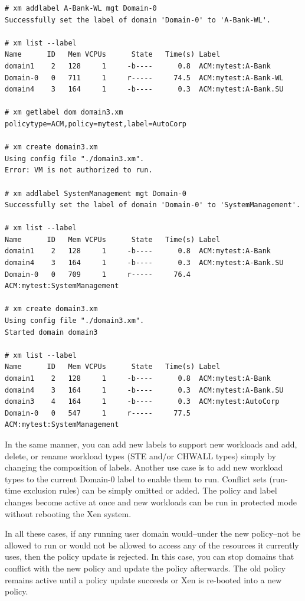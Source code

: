 \documentclass[11pt,twoside,final,openright]{report}
\begin{document}
\begin{scriptsize}
\begin{verbatim}
# xm addlabel A-Bank-WL mgt Domain-0
Successfully set the label of domain 'Domain-0' to 'A-Bank-WL'.

# xm list --label
Name      ID   Mem VCPUs      State   Time(s) Label
domain1    2   128     1     -b----      0.8  ACM:mytest:A-Bank
Domain-0   0   711     1     r-----     74.5  ACM:mytest:A-Bank-WL
domain4    3   164     1     -b----      0.3  ACM:mytest:A-Bank.SU

# xm getlabel dom domain3.xm
policytype=ACM,policy=mytest,label=AutoCorp

# xm create domain3.xm
Using config file "./domain3.xm".
Error: VM is not authorized to run.

# xm addlabel SystemManagement mgt Domain-0
Successfully set the label of domain 'Domain-0' to 'SystemManagement'.

# xm list --label
Name      ID   Mem VCPUs      State   Time(s) Label
domain1    2   128     1     -b----      0.8  ACM:mytest:A-Bank
domain4    3   164     1     -b----      0.3  ACM:mytest:A-Bank.SU
Domain-0   0   709     1     r-----     76.4  ACM:mytest:SystemManagement

# xm create domain3.xm
Using config file "./domain3.xm".
Started domain domain3

# xm list --label
Name      ID   Mem VCPUs      State   Time(s) Label
domain1    2   128     1     -b----      0.8  ACM:mytest:A-Bank
domain4    3   164     1     -b----      0.3  ACM:mytest:A-Bank.SU
domain3    4   164     1     -b----      0.3  ACM:mytest:AutoCorp
Domain-0   0   547     1     r-----     77.5  ACM:mytest:SystemManagement
\end{verbatim}
\end{scriptsize}

In the same manner, you can add new labels to support new workloads and
add, delete, or rename workload types (STE and/or CHWALL types) simply
by changing the composition of labels. Another use case is to add new
workload types to the current Domain-0 label to enable them to run.
Conflict sets (run-time exclusion rules) can be simply omitted or added.
The policy and label changes become active at once and new workloads
can be run in protected mode without rebooting the Xen system.

In all these cases, if any running user domain would--under the new policy--not
be allowed to run or would not be allowed to access any of the resources
it currently uses, then the policy update is rejected. In this case, you
can stop domains that conflict with the new policy and update the policy
afterwards. The old policy remains active until a policy update succeeds
or Xen is re-booted into a new policy.
\end{document}
